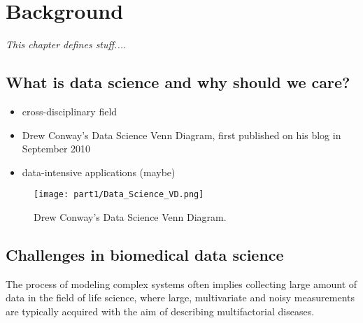 
\chapter{Background} \label{chap:background}

\begin{displayquote}
	\textit{This chapter defines stuff....}
\end{displayquote}


\section{What is data science and why should we care?} \label{sec:data_science}





\begin{itemize}
  \item cross-disciplinary field
  \item Drew Conway's Data Science Venn Diagram, first published on his blog in September 2010
  \item data-intensive applications (maybe)

\end{itemize}

\begin{figure}
  \centering
    \texttt{[image: part1/Data\_Science\_VD.png]}
    \caption{Drew Conway's Data Science Venn Diagram\protect\footnotemark.} \label{fig:data_science_venn_diagram}
\end{figure}

\section{Challenges in biomedical data science} \label{sec:challenges_biomedical}
The process of modeling complex systems often implies collecting large amount of data in the field of life science, where large, multivariate and noisy measurements are typically acquired with the aim of describing multifactorial diseases.



